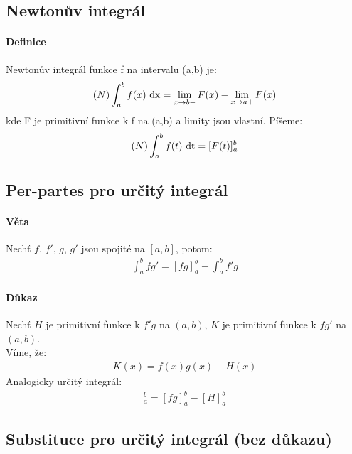 \documentclass[a4paper,10pt]{article}
\begin{document}
\subsection{Newtonův integrál}
\setcounter{equation}{0}
\paragraph{Definice}
Newtonův integrál funkce f na intervalu (a,b) je:
\begin{align*}
	(N) \int_a^b f(x) \operatorname*{\,dx} = \lim_{x\to b-} F(x) - \lim_{x \to a+} F(x)
\end{align*}
kde F je primitivní funkce k f na (a,b) a limity jsou vlastní. Píšeme:
\begin{align*}
	(N) \int_a^b f(t) \operatorname*{\,dt} = [ F(t) ]_a^b
\end{align*}

\subsection{Per-partes pro určitý integrál}
\setcounter{equation}{0}
\paragraph{Věta}
Nechť $f$, $f'$, $g$, $g'$ jsou spojité na $[a,b]$, potom:
\begin{align*}
	\int_a^b fg' = [fg]_a^b - \int_a^b f'g
\end{align*}

\paragraph{Důkaz}
Nechť $H$ je primitivní funkce k $f'g$ na $(a,b)$, $K$ je primitivní funkce k
$fg'$ na $(a,b)$. \\
Víme, že: 
\begin{align}
	K(x) = f(x)g(x) - H(x)
\end{align}
Analogicky určitý integrál:
\begin{align}
	[K(x)]_a^b = [fg]_a^b - [H]_a^b
\end{align}


\subsection{Substituce pro určitý integrál (bez důkazu)}
\setcounter{equation}{0}
\end{document}
